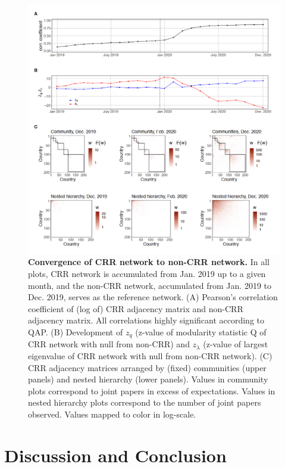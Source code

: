 \begin{figure}[!h]
\includegraphics[width=\textwidth]{1_chapter1/figures/Fig4.png} %
\caption{{\bf Convergence of CRR network to non-CRR network.}
{\small In all plots, CRR network is accumulated from Jan. 2019 up to a given month, and the non-CRR network, accumulated from Jan. 2019 to Dec. 2019, serves as the reference network. (A) Pearson's correlation coefficient of (log of) CRR adjacency matrix and non-CRR adjacency matrix. All correlations highly significant according to QAP. (B) Development of $z_q$ (z-value of modularity statistic Q of CRR network with null from non-CRR) and $z_\lambda$ (z-value of largest eigenvalue of CRR network with null from non-CRR network). (C) CRR adjacency matrices arranged by (fixed) communities (upper panels) and nested hierarchy (lower panels). Values in community plots correspond to joint papers in excess of expectations. Values in nested hierarchy plots correspond to the number of joint papers observed. Values mapped to color in log-scale.}}
\label{fig:NetwConvergence} 
\end{figure}




\section{Discussion and Conclusion}

